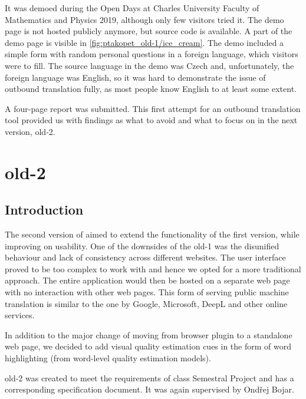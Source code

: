 It was demoed during the Open Days at Charles University Faculty of Mathematics and Physics 2019, although only few visitors tried it. The demo page is not hosted publicly anymore, but source code is available. A part of the demo page is visible in \cref{fig:ptakopet_old-1/ice_cream}. The demo included a simple form with random personal questions in a foreign language, which visitors were to fill. The source language in the demo was Czech and, unfortunately, the foreign language was English, so it was hard to demonstrate the issue of outbound translation fully, as most people know English to at least some extent.

A four-page report was submitted. This first attempt for an outbound translation tool provided us with findings as what to avoid and what to focus on in the next version, \ptakopet{} old-2.

\section{\ptakopet{} old-2}

\subsection{Introduction}

The second version of \ptakopet{} aimed to extend the functionality of the first version, while improving on usability. One of the downsides of the \ptakopet{} old-1 was the disunified behaviour and lack of consistency across different websites. The user interface proved to be too complex to work with and hence we opted for a more traditional approach. The entire application would then be hosted on a separate web page with no interaction with other web pages. This form of serving public machine translation is similar to the one by Google, Microsoft, DeepL and other online services.

In addition to the major change of moving from browser plugin to a standalone web page, we decided to add visual quality estimation cues in the form of word highlighting (from word-level quality estimation models).

\ptakopet{} old-2 was created to meet the requirements of class Semestral Project and has a corresponding specification document. It was again supervised by Ondřej Bojar.

